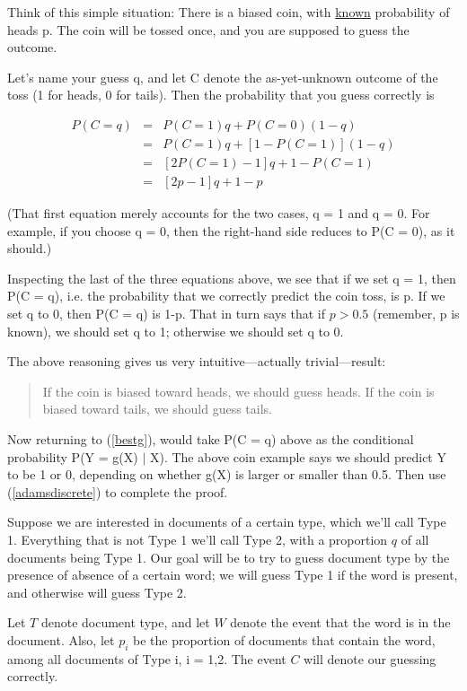 Think of this simple situation:  There is a biased coin, with
\underline{known} probability of heads p.  The coin will be tossed once,
and you are supposed to guess the outcome.  

Let's name your guess q, and let C denote the as-yet-unknown outcome of
the toss (1 for heads, 0 for tails).  Then the probability that you
guess correctly is

\begin{eqnarray}
P(C = q) &=& P(C = 1) q + P(C = 0) (1-q) \\ 
&=& P(C = 1) q + [1 - P(C = 1)] (1-q) \\ 
&=& [2 P(C = 1) - 1] q + 1 - P(C = 1) \\
&=& [2 p - 1] q + 1 - p 
\end{eqnarray}

(That first equation merely accounts for the two cases, q = 1 and q =
0.  For example, if you choose q = 0, then the right-hand side reduces
to P(C = 0), as it should.)

Inspecting the last of the three equations above, we see that if we set
q = 1, then P(C = q), i.e. the probability that we correctly predict the
coin toss, is p.  If we set q to 0, then P(C = q) is 1-p.  That in turn
says that if $p > 0.5$ (remember, p is known), we should set q to 1;
otherwise we should set q to 0.

The above reasoning gives us very intuitive---actually trivial---result:

\begin{quote}
If the coin is biased toward heads, we should guess heads.  If the coin
is biased toward tails, we should guess tails.
\end{quote}

Now returning to (\ref{bestg}), would take P(C = q) above as the
conditional probability P(Y = g(X) $|$ X).  The above coin example says
we should predict Y to be 1 or 0, depending on whether g(X) is larger or
smaller than 0.5.  Then use (\ref{adamsdiscrete}) to complete the proof.


\startproblemset

\oneproblem
Suppose we are interested in documents of a certain type, which we'll
call Type 1.  Everything that is not Type 1 we'll call Type 2, with
a proportion $q$ of all documents being Type 1.  Our goal will be to 
try to guess document type by the presence of absence of a certain word;
we will guess Type 1 if the word is present, and otherwise will guess
Type 2.  

Let $T$ denote document type, and let $W$ denote the event that the word
is in the document.  Also, let $p_i$ be the proportion of documents that
contain the word, among all documents of Type i, i = 1,2.  The event $C$
will denote our guessing correctly.

